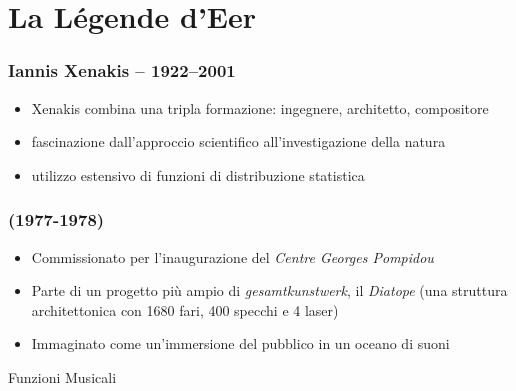 \documentclass[mode=\printmode,compress,xcolor=dvipsnames]{beamer}
\begin{document}
\section{La L\'egende d'Eer}

\begin{frame}
        \frametitle<+->{Iannis Xenakis -- 1922--2001}

   \begin{itemize}[<+->]

      \item Xenakis combina una tripla formazione: ingegnere, architetto,
            compositore

     \item fascinazione dall'approccio scientifico all'investigazione della
             natura 

     \item utilizzo estensivo di funzioni di distribuzione statistica

   \end{itemize}

\end{frame}

\begin{frame}
   \frametitle<+->{\LLdE (1977-1978)}

   \begin{itemize}[<+->]

      \item Commissionato per l'inaugurazione del \emph{Centre Georges Pompidou}

      \item Parte di un progetto pi\`u ampio di \emph{gesamtkunstwerk}, il
              \emph{Diatope} (una struttura architettonica con 1680 fari, 400
              specchi e 4 laser)

      \item Immaginato come un'immersione del pubblico in un oceano di suoni


   \end{itemize}

\end{frame}

{\Large Funzioni Musicali}
\end{document}
